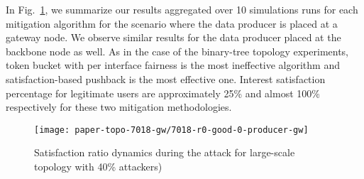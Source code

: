


In Fig.~\ref{fig:large-scale}, we summarize our results aggregated over 10 simulations runs for each mitigation algorithm for the scenario where the data producer is placed at a gateway node. We observe similar results for the data producer placed at the backbone node as well. As in the case of the binary-tree topology experiments, token bucket with per interface fairness is the most ineffective algorithm and satisfaction-based pushback is the most effective one.   Interest satisfaction percentage for legitimate users are approximately 25\% and almost 100\% respectively for these two mitigation methodologies.

%

\begin{figure}[tbh]
 \centering
 \texttt{[image: paper-topo-7018-gw/7018-r0-good-0-producer-gw]}
 \vspace{-.3cm}\caption{Satisfaction ratio dynamics during the attack for large-scale topology with 40\% attackers)}\vspace{-.4cm}
 \label{fig:large-scale}
\end{figure}

